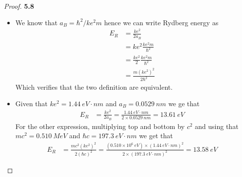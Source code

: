 \documentclass[11pt]{article}
\theoremstyle{definition}
\begin{document}
\begin{proof}{\textbf{5.8}}
    \begin{itemize}
    \item [(a)]
    We know that $a_B = \hbar^2 / ke^2 m$ hence we can write
    Rydberg energy as
    \begin{align*}
        E_R &= \frac{ke^2}{2a_B}\\
            &= ke^2\frac{ke^2 m}{\hbar^2}\\
            &= \frac{ke^2}{2}\frac{ke^2 m}{\hbar^2}\\
            &= \frac{m (ke^2)^2}{2\hbar^2}
    \end{align*}
    Which verifies that the two definition are  equivalent.

    \item [(b)] Given that $ke^2 = 1.44~eV\cdot nm$ and $a_B = 0.0529~nm$
    we ge that
    \begin{align*}
        E_R &= \frac{ke^2}{2a_B} = \frac{1.44~eV\cdot nm}{2 \times 0.0529~nm}
        = 13.61~eV
    \end{align*}
    For the other expression, multiplying top and bottom by $c^2$
    and using that $mc^2 = 0.510~MeV$ and $\hbar c = 197.3~eV\cdot nm$
    we get that
    \begin{align*}
        E_R &= \frac{mc^2 (ke^2)^2}{2(\hbar c)^2}
        = \frac{(0.510 \times 10^6~eV)\times(1.44~eV\cdot nm)^2}
        {2\times (197.3~eV\cdot nm)^2}
        = 13.58~eV
    \end{align*}
    \end{itemize}
\end{proof}
\cleardoublepage
\end{document}

